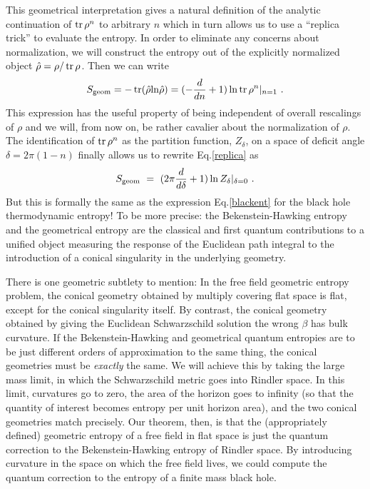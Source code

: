 \documentclass[12pt]{article}
\begin{document}
This geometrical interpretation gives a natural definition of the analytic
continuation of $\mathop{\rm tr}\rho^n$ to arbitrary $n$ which in turn allows us to
use
a ``replica trick'' to evaluate the entropy. In order to eliminate any concerns
about normalization, we will construct the entropy out of the explicitly
normalized object $\hat\rho = \rho/\mathop{\rm tr}\rho$. Then we can write
\begin{equation}
S_{\rm geom} = -\mathop{\rm tr}(\hat\rho {\rm ln} \hat\rho) =
(-{d\over dn} + 1) \ln \mathop{\rm tr}\rho^n |_{n=1}~.
\label{replica}
\end{equation}
This expression has the useful property of being independent of overall
rescalings of $\rho$ and we will, from now on, be rather cavalier about the
normalization of $\rho$. The identification of $\mathop{\rm tr}\rho^n$ as the
partition
function, $Z_\delta$, on a space of deficit angle $\delta=2\pi(1-n)$ finally
allows us to rewrite Eq.\ref{replica} as
\begin{equation}
S_{\rm geom}~=~(2\pi{d\over d\delta} +1) \ln Z_\delta |_{\delta=0}~.
\label{reptodef}
\end{equation}
But this is formally the same as the expression Eq.\ref{blackent} for the black
hole thermodynamic entropy! To be more precise:  the Bekenstein-Hawking
entropy and the geometrical entropy are the classical and first
quantum contributions to a unified object measuring the response of the
Euclidean path integral to the introduction of a conical singularity in the
underlying geometry.

There is one geometric subtlety to mention: In the free field geometric entropy
problem, the conical geometry obtained by multiply covering flat space is
flat, except for the conical singularity itself.
By contrast, the conical geometry obtained by giving the Euclidean
Schwarzschild solution the wrong $\beta$ has bulk curvature. If the
Bekenstein-Hawking and geometrical quantum entropies are to be just different
orders of approximation to the same thing, the conical geometries must be
{\it exactly} the same. We will achieve this by taking the large mass limit,
in which the Schwarzschild metric goes into Rindler space. In this limit,
curvatures go to zero, the area of the horizon goes to infinity (so that the
quantity of interest becomes entropy per unit horizon area), and the two
conical geometries match precisely. Our theorem, then, is that the
(appropriately defined) geometric entropy of a free field in flat space is just
the quantum correction to the Bekenstein-Hawking entropy of Rindler space.
By introducing curvature in the space on which the free field lives, we could
compute the quantum correction to the entropy of a finite mass black hole.
\end{document}
